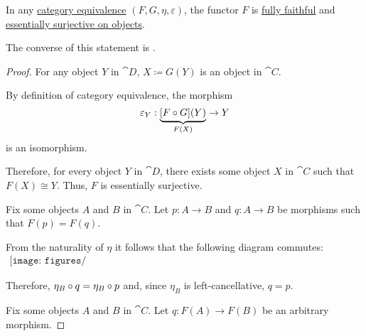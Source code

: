 \begin{proposition}\label{thm:category_equivalence_is_fully_faithful_and_essentially_surjective}
  In any \hyperref[def:category_equivalence]{category equivalence} \( (F, G, \eta, \varepsilon) \), the functor \( F \) is \hyperref[def:functor_invertibility/fully_faithful]{fully faithful} and \hyperref[def:functor_invertibility/surjective_on_objects]{essentially surjective on objects}.

  The converse of this statement is .
\end{proposition}
\begin{proof}
   For any object \( Y \) in \( \cat{D} \), \( X \coloneqq G(Y) \) is an object in \( \cat{C} \).

  By definition of category equivalence, the morphism
  \begin{equation*}
    \varepsilon_Y: \underbrace{[F \bincirc G](Y)}_{F(X)} \to Y
  \end{equation*}
  is an isomorphism.

  Therefore, for every object \( Y \) in \( \cat{D} \), there exists some object \( X \) in \( \cat{C} \) such that \( F(X) \cong Y \). Thus, \( F \) is essentially surjective.

   Fix some objects \( A \) and \( B \) in \( \cat{C} \). Let \( p: A \to B \) and \( q: A \to B \) be morphisms such that \( F(p) = F(q) \).

  From the naturality of \( \eta \) it follows that the following diagram commutes:
  \begin{equation}\label{eq:thm:category_equivalence_is_fully_faithful_and_essentially_surjective/faithfullness}
    \begin{aligned}
      \texttt{[image: figures/thm\_\_category\_equivalence\_is\_fully\_faithful\_and\_essentially\_surjective.pdf]}
    \end{aligned}
  \end{equation}

  Therefore, \( \eta_B \bincirc q = \eta_B \bincirc p \) and, since \( \eta_B \) is left-cancellative, \( q = p \).

   Fix some objects \( A \) and \( B \) in \( \cat{C} \). Let \( q: F(A) \to F(B) \) be an arbitrary morphism.


\end{proof}

